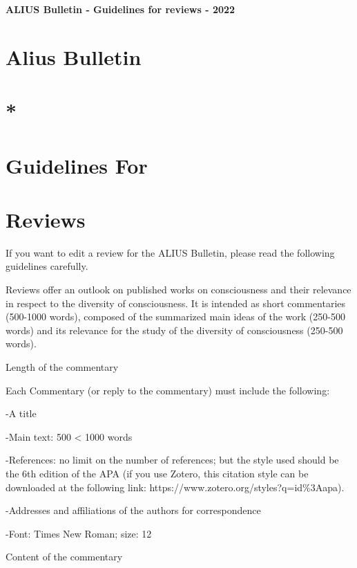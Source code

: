 \documentclass[11pt]{article}
\begin{document}
{\LARGE\bfseries ALIUS Bulletin - Guidelines for reviews - 2022\par}
\vspace{1em}
\section*{Alius Bulletin}
\section*{*}
\section*{Guidelines For}
\section*{Reviews}
If you want to edit a review for the ALIUS Bulletin, please read the following guidelines carefully.\par

Reviews offer an outlook on published works on consciousness and their relevance in respect to the diversity of consciousness. It is intended as short commentaries (500-1000 words), composed of the summarized main ideas of the work (250-500 words) and its relevance for the study of the diversity of consciousness (250-500 words).\par

Length of the commentary\par

Each Commentary (or reply to the commentary) must include the following:\par

-A title\par

-Main text: 500 < 1000 words\par

-References: no limit on the number of references; but the style used should be the 6th edition of the APA (if you use Zotero, this citation style can be downloaded at the following link: https://www.zotero.org/styles?q=id\%3Aapa).\par

-Addresses and affiliations of the authors for correspondence\par

-Font: Times New Roman; size: 12\par

Content of the commentary\par
\end{document}
